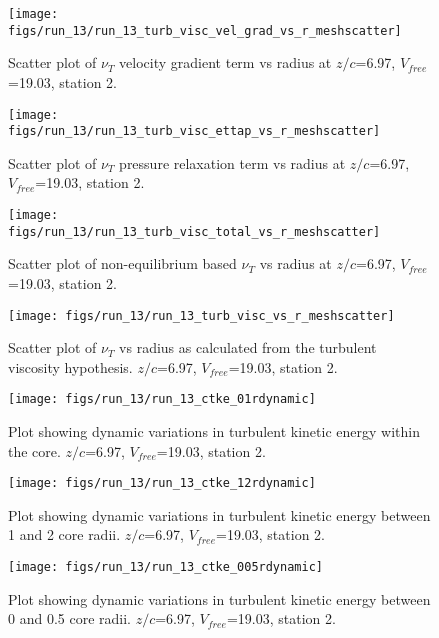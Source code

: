 \begin{figure}[H]
\centering
\texttt{[image: figs/run\_13/run\_13\_turb\_visc\_vel\_grad\_vs\_r\_meshscatter]}
\caption{Scatter plot of $\nu_T$ velocity gradient term vs radius at $z/c$=6.97, $V_{free}$=19.03, station 2.}
\end{figure}


\begin{figure}[H]
\centering
\texttt{[image: figs/run\_13/run\_13\_turb\_visc\_ettap\_vs\_r\_meshscatter]}
\caption{Scatter plot of $\nu_T$ pressure relaxation term vs radius at $z/c$=6.97, $V_{free}$=19.03, station 2.}
\end{figure}


\begin{figure}[H]
\centering
\texttt{[image: figs/run\_13/run\_13\_turb\_visc\_total\_vs\_r\_meshscatter]}
\caption{Scatter plot of non-equilibrium based $\nu_T$ vs radius at $z/c$=6.97, $V_{free}$=19.03, station 2.}
\end{figure}


\begin{figure}[H]
\centering
\texttt{[image: figs/run\_13/run\_13\_turb\_visc\_vs\_r\_meshscatter]}
\caption{Scatter plot of $\nu_T$ vs radius as calculated from the turbulent viscosity hypothesis. $z/c$=6.97, $V_{free}$=19.03, station 2.}
\end{figure}


\begin{figure}[H]
\centering
\texttt{[image: figs/run\_13/run\_13\_ctke\_01rdynamic]}
\caption{Plot showing dynamic variations in turbulent kinetic energy within the core. $z/c$=6.97, $V_{free}$=19.03, station 2.}
\end{figure}


\begin{figure}[H]
\centering
\texttt{[image: figs/run\_13/run\_13\_ctke\_12rdynamic]}
\caption{Plot showing dynamic variations in turbulent kinetic energy between 1 and 2 core radii. $z/c$=6.97, $V_{free}$=19.03, station 2.}
\end{figure}


\begin{figure}[H]
\centering
\texttt{[image: figs/run\_13/run\_13\_ctke\_005rdynamic]}
\caption{Plot showing dynamic variations in turbulent kinetic energy between 0 and 0.5 core radii. $z/c$=6.97, $V_{free}$=19.03, station 2.}
\end{figure}


